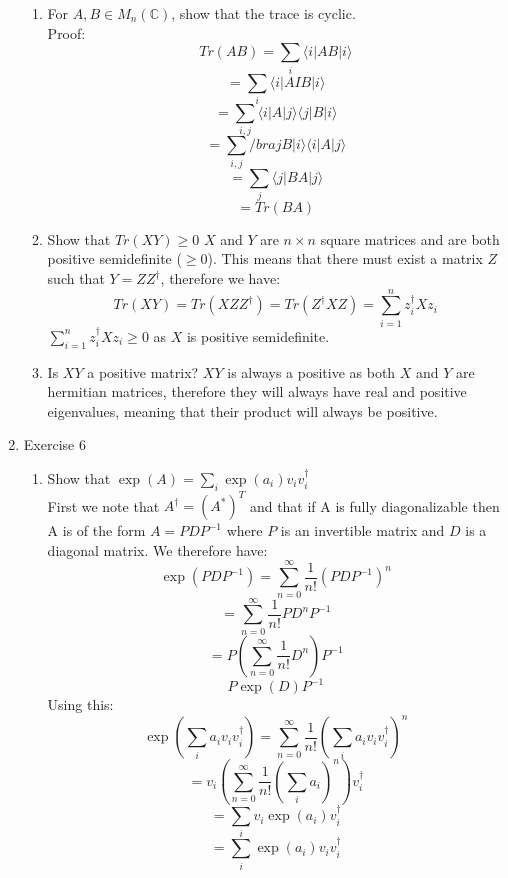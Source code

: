 \documentclass[12pt]{article}
\newcommand{\ket}[1]{\vert{#1}\rangle}
\newcommand{\bra}[1]{\langle{#1}\vert}
\begin{document}
\begin{enumerate}
\begin{enumerate}
    \item For $A,B \in M_n(\mathbb{C})$, show that the trace is cyclic. 
    \\ Proof: 
    $$ Tr(AB) = \sum_i \bra{i}AB\ket{i} $$
    $$ = \sum_i \bra{i} AIB\ket{i} $$
    $$ = \sum_{i,j} \bra{i}A\ket{j}\bra{j}B\ket{i} $$
    $$ = \sum_{i,j} /bra{j}B\ket{i}\bra{i}A\ket{j} $$
    $$ =\sum_j \bra{j} BA \ket{j} $$
    $$ = Tr(BA) $$
    \item Show that $Tr(XY) \geq 0$ 
    $X$ and $Y$ are $n\times n$ square matrices and are both positive semidefinite ($\geq 0$). This means that there must exist a matrix $Z$ such that $Y=ZZ^\dagger$, therefore we have:
    $$ Tr(XY) = Tr(XZZ^{\dagger}) = Tr(Z^{\dagger} X Z) = \sum_{i=1}^{n} z_i^{\dagger} X z_i $$
    $  \sum_{i=1}^n z_i^\dagger X z_i \geq 0 $ as $X$ is positive semidefinite. 
    \\ 
    
    \item Is $XY$ a positive matrix?
    $XY$ is always a positive as both $X$ and $Y$ are hermitian matrices, therefore they will always have real and positive eigenvalues, meaning that their product will always be positive. 

\end{enumerate}


\item Exercise 6
\begin{enumerate}
    \item Show that $\exp(A) = \sum_i \exp(a_i)v_i v_i^\dagger $
    \\ First we note that $A^\dagger = (A^*)^T$ and that if A is fully diagonalizable then A is of the form $A = PDP^{-1}$ where $P$ is an invertible matrix and $D$ is a diagonal matrix. 
    We therefore have: 
    $$ \exp(PDP^{-1}) = \sum_{n=0}^{\infty} \frac{1}{n!} (PDP^{-1})^n$$ 
    $$ = \sum_{n=0}^{\infty} \frac{1}{n!} PD^nP^{-1} $$
    $$ = P(\sum_{n=0}^{\infty} \frac{1}{n!} D^n) P^{-1} $$
    $$ P \exp(D) P^{-1} $$
    Using this: 
    $$ \exp(\sum_i a_i v_i v_i^\dagger) = \sum_{n=0}^{\infty} \frac{1}{n!}(\sum_i a_i v_i v_i^\dagger)^n $$
    $$ = v_i (\sum_{n=0}^{\infty} \frac{1}{n!} (\sum_i a_i)^n ) v_i^\dagger $$
    $$ = \sum_i v_i \exp(a_i) v_i^\dagger $$
    $$ = \sum_i \exp(a_i) v_i v_i^\dagger $$


\end{enumerate}
\end{enumerate}
\end{document}
